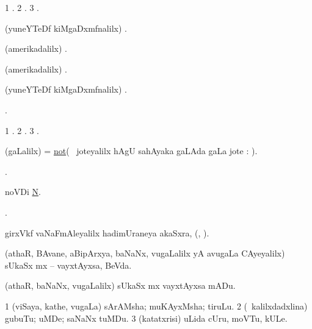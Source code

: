 \bentry
{}
\gl{\saMkiSx}
\bmng
\bnum
\num{1} . 
\num{2} . 
\num{3} . 
\enum
\emng
\eentry

\bentry
{}
\gl{\saMkiSx}
\bmng
(yuneYTeDf kiMgaDxmfnalilx) . 
\emng
\eentry

\bentry
{}
\gl{\saMkiSx}
\bmng
(amerikadalilx) . 
\emng
\eentry

\bentry
{}
\gl{\saMkiSx}
\bmng
(amerikadalilx) . 
\emng
\eentry

\bentry
{}
\gl{\saMkiSx}
\bmng
(yuneYTeDf kiMgaDxmfnalilx) . 
\emng
\eentry

\bentry
{}
\gl{\saMkiSx}
\bmng
{}. 
\emng
\eentry

\bentry
{}
\gl{\saMkiSx}
\bmng
\bnum
\num{1} . 
\num{2} . 
\num{3} . 
\enum
\emng
\eentry

\bentry
{}
\gl{\kirxvi}
\bmng
(\saMpa gaLalilx) = \hyperlink{not}{not}(\sA\  joteyalilx hAgU sahAyaka \kirx gaLAda gaLa jote \parx: ). 
\emng
\eentry

\bentry
{}
\gl{\saMkiSx}
\bmng
{}. 
\emng
\eentry

\bentry
{}
\bmng
noVDi \hyperlink{N, n}{N}. 
\emng
\eentry

\bentry
{}
\gl{\saMkiSx}
\bmng
{}. 
\emng
\eentry

\bentry
{}
\gl{\nA}
\bmng
girxVkf vaNaFmAleyalilx hadimUraneya akaSxra, (, \eng{$\nu$}). 
\emng
\eentry

\bentry
{}
\gl{\nA}
\bmng
(athaR, BAvane, aBipArxya, baNaNx, \mo vugaLalilx yA avugaLa CAyeyalilx) sUkaSx mx -- vayxtAyxsa, BeVda. 
\emng
\eentry

\bentry
{}
\gl{\sakirx}
\bmng
(athaR, baNaNx, \mo vugaLalilx) sUkaSx mx vayxtAyxsa mADu. 
\emng
\eentry

\bentry
{}
\gl{\nA}
\bmng
\bnum
\num{1} (viSaya, kathe, \mo vugaLa) sArAMsha; muKAyxMsha; tiruLu. 
\num{2} (\kanmu\ kalilxdadxlina) gubuTu; uMDe; saNaNx tuMDu. 
\num{3} (katatxrisi) uLida cUru, moVTu, kULe. 
\enum
\emng
\eentry

